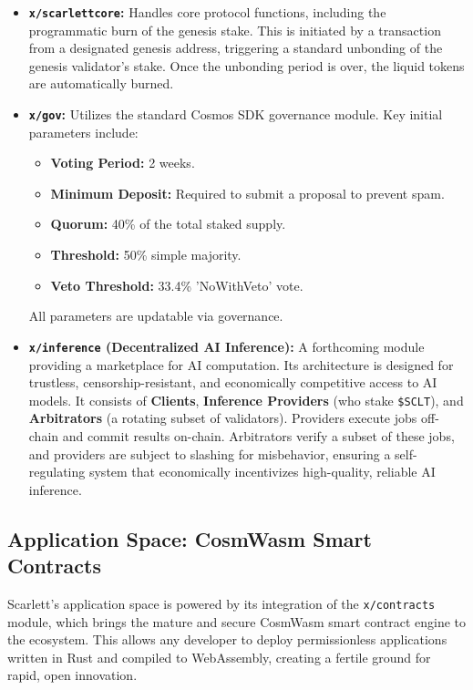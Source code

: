 \documentclass[10pt]{article}
\begin{document}
\begin{itemize}[leftmargin=*, itemsep=2pt]
    \item \textbf{\texttt{x/scarlettcore}:} Handles core protocol functions, including the programmatic burn of the genesis stake. This is initiated by a transaction from a designated genesis address, triggering a standard unbonding of the genesis validator's stake. Once the unbonding period is over, the liquid tokens are automatically burned.
    \item \textbf{\texttt{x/gov}:} Utilizes the standard Cosmos SDK governance module. Key initial parameters include:
    \begin{itemize}[leftmargin=*, itemsep=2pt]
        \item \textbf{Voting Period:} 2 weeks.
        \item \textbf{Minimum Deposit:} Required to submit a proposal to prevent spam.
        \item \textbf{Quorum:} 40\% of the total staked supply.
        \item \textbf{Threshold:} 50\% simple majority.
        \item \textbf{Veto Threshold:} 33.4\% 'NoWithVeto' vote.
    \end{itemize}
    All parameters are updatable via governance.
    \item \textbf{\texttt{x/inference} (Decentralized AI Inference):} A forthcoming module providing a marketplace for AI computation. Its architecture is designed for trustless, censorship-resistant, and economically competitive access to AI models. It consists of \textbf{Clients}, \textbf{Inference Providers} (who stake \texttt{\$SCLT}), and \textbf{Arbitrators} (a rotating subset of validators). Providers execute jobs off-chain and commit results on-chain. Arbitrators verify a subset of these jobs, and providers are subject to slashing for misbehavior, ensuring a self-regulating system that economically incentivizes high-quality, reliable AI inference.
\end{itemize}

\subsection{Application Space: CosmWasm Smart Contracts}
Scarlett's application space is powered by its integration of the \texttt{x/contracts} module, which brings the mature and secure CosmWasm smart contract engine to the ecosystem. This allows any developer to deploy permissionless applications written in Rust and compiled to WebAssembly, creating a fertile ground for rapid, open innovation.
\end{document}
